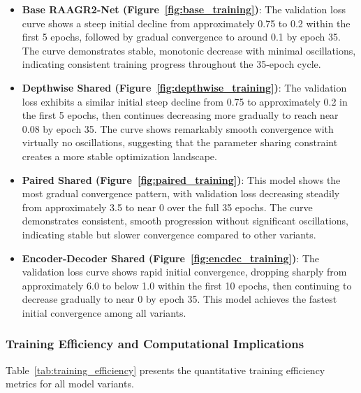 \documentclass[12pt,a4paper]{article}
\begin{document}
\begin{enumerate}
\begin{itemize}
\item \textbf{Base RAAGR2-Net (Figure~\ref{fig:base_training})}: The validation loss curve shows a steep initial decline from approximately 0.75 to 0.2 within the first 5 epochs, followed by gradual convergence to around 0.1 by epoch 35. The curve demonstrates stable, monotonic decrease with minimal oscillations, indicating consistent training progress throughout the 35-epoch cycle.

\item \textbf{Depthwise Shared (Figure~\ref{fig:depthwise_training})}: The validation loss exhibits a similar initial steep decline from 0.75 to approximately 0.2 in the first 5 epochs, then continues decreasing more gradually to reach near 0.08 by epoch 35. The curve shows remarkably smooth convergence with virtually no oscillations, suggesting that the parameter sharing constraint creates a more stable optimization landscape.

\item \textbf{Paired Shared (Figure~\ref{fig:paired_training})}: This model shows the most gradual convergence pattern, with validation loss decreasing steadily from approximately 3.5 to near 0 over the full 35 epochs. The curve demonstrates consistent, smooth progression without significant oscillations, indicating stable but slower convergence compared to other variants.

\item \textbf{Encoder-Decoder Shared (Figure~\ref{fig:encdec_training})}: The validation loss curve shows rapid initial convergence, dropping sharply from approximately 6.0 to below 1.0 within the first 10 epochs, then continuing to decrease gradually to near 0 by epoch 35. This model achieves the fastest initial convergence among all variants.

\end{itemize}

\subsubsection{Training Efficiency and Computational Implications}

Table~\ref{tab:training_efficiency} presents the quantitative training efficiency metrics for all model variants.


\end{enumerate}
\end{document}
